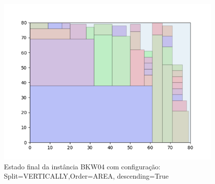 \begin{figure}[H]
    \centering
    \caption[]{Estado final da instância BKW04 com configuração: Split=VERTICALLY,Order=AREA, descending=True}
    \label{fig:bkw04-vertically-area-true}
    \includegraphics[scale=0.5]{output/figures/bkw/bkw04/vertically/area/true/00}
\end{figure}